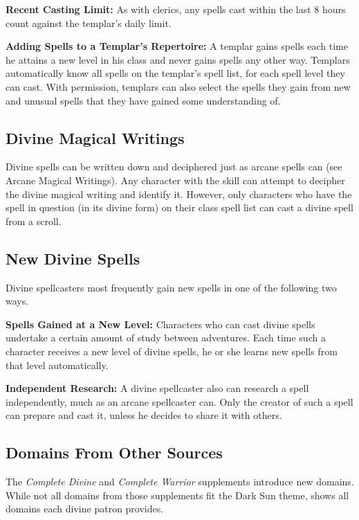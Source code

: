 \textbf{Recent Casting Limit:} As with clerics, any spells cast within the last 8 hours count against the templar's daily limit.

\textbf{Adding Spells to a Templar's Repertoire:} A templar gains spells each time he attains a new level in his class and never gains spells any other way. Templars automatically know all spells on the templar's spell list, for each spell level they can cast. With permission, templars can also select the spells they gain from new and unusual spells that they have gained some understanding of.

\subsection{Divine Magical Writings}
Divine spells can be written down and deciphered just as arcane spells can (see Arcane Magical Writings). Any character with the  skill can attempt to decipher the divine magical writing and identify it. However, only characters who have the spell in question (in its divine form) on their class spell list can cast a divine spell from a scroll.

\subsection{New Divine Spells}
Divine spellcasters most frequently gain new spells in one of the following two ways.

\textbf{Spells Gained at a New Level:} Characters who can cast divine spells undertake a certain amount of study between adventures. Each time such a character receives a new level of divine spells, he or she learns new spells from that level automatically.

\textbf{Independent Research:} A divine spellcaster also can research a spell independently, much as an arcane spellcaster can. Only the creator of such a spell can prepare and cast it, unless he decides to share it with others.

\subsection{Domains From Other Sources}
The \emph{Complete Divine} and \emph{Complete Warrior} supplements introduce new domains. While not all domains from those supplements fit the {\tableheader Dark Sun} theme,  shows all domains each divine patron provides.

